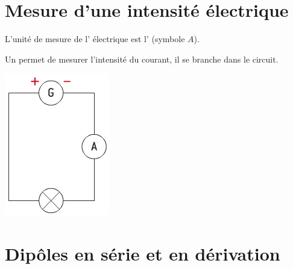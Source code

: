 \documentclass[12pt,a4paper]{article}
\begin{document}
	
	

\section{Mesure d'une intensité électrique}


\begin{mybilan}
	L'unité de mesure de l' électrique est l'  (symbole $A$). 
	
	Un  permet de mesurer l'intensité du courant, il se branche  dans le circuit.
	
	\begin{center}
		\includegraphics[scale=0.6]{img/schema1}
	\end{center}
\end{mybilan}

\begin{myexos}
\end{myexos}




\section{Dipôles en série et en dérivation}
\end{document}
